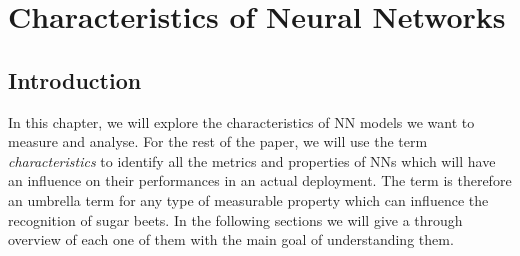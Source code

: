 \chapter{Characteristics of Neural Networks}\label{char_nn}
\section{Introduction}
In this chapter, we will explore the characteristics of NN models we want to measure and analyse. For the rest of the paper, we will use the term \textit{characteristics} to identify all the metrics and properties of NNs which will have an influence on their performances in an actual deployment. The term is therefore an umbrella term for any type of measurable property which can influence the recognition of sugar beets. In the following sections we will give a through overview of each one of them with the main goal of understanding them. 

